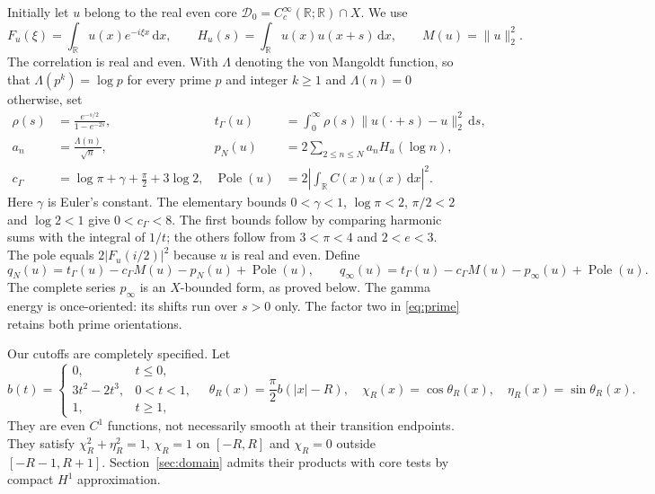 \documentclass[11pt]{article}
\theoremstyle{remark}\newtheorem{remark}[theorem]{Remark}
\newcommand{\R}{\mathbb R}
\newcommand{\dd}{\,\mathrm d}
\newcommand{\norm}[1]{\lVert#1\rVert}
\newcommand{\Pole}{\operatorname{Pole}}
\numberwithin{equation}{section}
\begin{document}
Initially let $u$ belong to the real even core
$\mathcal D_0=C_c^\infty(\R;\R)\cap X$. We use
\begin{equation}\label{eq:fourier-correlation}
 F_u(\xi)=\int_\R u(x)e^{-i\xi x}\dd x,\qquad
 H_u(s)=\int_\R u(x)u(x+s)\dd x,
 \qquad M(u)=\norm{u}_2^2.
\end{equation}
The correlation is real and even. With $\Lambda$ denoting the von Mangoldt
function, so that $\Lambda(p^k)=\log p$ for every prime $p$ and integer
$k\ge1$ and $\Lambda(n)=0$ otherwise, set
\begin{align}
 \rho(s)&=\frac{e^{-s/2}}{1-e^{-2s}},&
 t_\Gamma(u)&=\int_0^\infty\rho(s)\norm{u(\cdot+s)-u}_2^2\dd s,
 \label{eq:gamma}\\
 a_n&=\frac{\Lambda(n)}{\sqrt n},&
 p_N(u)&=2\sum_{2\le n\le N}a_nH_u(\log n),
 \label{eq:prime}\\
 c_\Gamma&=\log\pi+\gamma+\frac\pi2+3\log2,&
 \Pole(u)&=2\left|\int_\R C(x)u(x)\dd x\right|^2.
 \label{eq:constant-pole}
\end{align}
Here $\gamma$ is Euler's constant. The elementary bounds
$0<\gamma<1$, $\log\pi<2$, $\pi/2<2$ and $\log2<1$ give
$0<c_\Gamma<8$. The first bounds follow by comparing harmonic sums
with the integral of $1/t$; the others follow from $3<\pi<4$ and
$2<e<3$. The pole equals $2|F_u(i/2)|^2$ because $u$ is real and even.
Define
\begin{equation}\label{eq:forms}
 q_N(u)=t_\Gamma(u)-c_\Gamma M(u)-p_N(u)+\Pole(u),
 \qquad q_\infty(u)=t_\Gamma(u)-c_\Gamma M(u)-p_\infty(u)+\Pole(u).
\end{equation}
The complete series $p_\infty$ is an $X$-bounded form, as proved below.
The gamma energy is once-oriented: its shifts run over $s>0$ only.
The factor two in \eqref{eq:prime} retains both prime orientations.

Our cutoffs are completely specified. Let
\begin{equation}\label{eq:cutoffs}
 b(t)=\begin{cases}0,&t\le0,\\3t^2-2t^3,&0<t<1,\\1,&t\ge1,\end{cases}
 \quad \theta_R(x)=\frac\pi2b(|x|-R),\quad
 \chi_R(x)=\cos\theta_R(x),\quad\eta_R(x)=\sin\theta_R(x).
\end{equation}
They are even $C^1$ functions, not necessarily smooth at their transition
endpoints. They satisfy $\chi_R^2+\eta_R^2=1$, $\chi_R=1$ on $[-R,R]$
and $\chi_R=0$ outside $[-R-1,R+1]$. Section~\ref{sec:domain} admits their
products with core tests by compact $H^1$ approximation.
\end{document}
